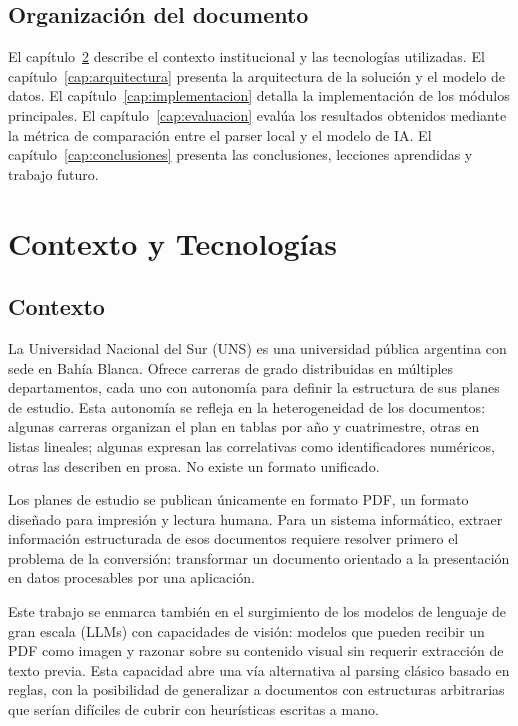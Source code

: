 \documentclass[12pt, a4paper]{report}
\begin{document}
\section{Organización del documento}

El capítulo~\ref{cap:contexto} describe el contexto institucional y las tecnologías
utilizadas. El capítulo~\ref{cap:arquitectura} presenta la arquitectura de la solución y el
modelo de datos. El capítulo~\ref{cap:implementacion} detalla la implementación de los
módulos principales. El capítulo~\ref{cap:evaluacion} evalúa los resultados obtenidos
mediante la métrica de comparación entre el parser local y el modelo de IA. El
capítulo~\ref{cap:conclusiones} presenta las conclusiones, lecciones aprendidas y trabajo
futuro.

\chapter{Contexto y Tecnologías}
\label{cap:contexto}

\section{Contexto}

La Universidad Nacional del Sur (UNS) es una universidad pública argentina con sede en
Bahía Blanca. Ofrece carreras de grado distribuidas en múltiples departamentos, cada uno
con autonomía para definir la estructura de sus planes de estudio. Esta autonomía se refleja
en la heterogeneidad de los documentos: algunas carreras organizan el plan en tablas por
año y cuatrimestre, otras en listas lineales; algunas expresan las correlativas como
identificadores numéricos, otras las describen en prosa. No existe un formato unificado.

Los planes de estudio se publican únicamente en formato PDF, un formato diseñado para
impresión y lectura humana. Para un sistema informático, extraer información estructurada de
esos documentos requiere resolver primero el problema de la conversión: transformar un
documento orientado a la presentación en datos procesables por una aplicación.

Este trabajo se enmarca también en el surgimiento de los modelos de lenguaje de gran escala
(LLMs) con capacidades de visión: modelos que pueden recibir un PDF como imagen y razonar
sobre su contenido visual sin requerir extracción de texto previa. Esta capacidad abre una
vía alternativa al parsing clásico basado en reglas, con la posibilidad de generalizar a
documentos con estructuras arbitrarias que serían difíciles de cubrir con heurísticas
escritas a mano.
\end{document}
